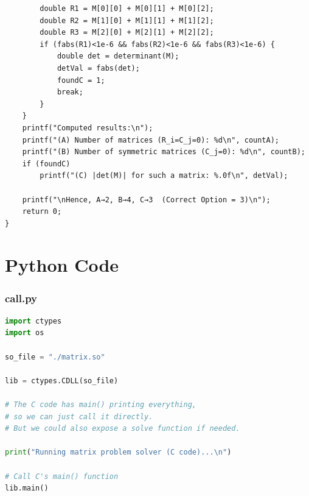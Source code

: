 \documentclass{beamer}
\theoremstyle{remark}
\numberwithin{equation}{section}
\numberwithin{equation}{section}
\begin{document}
   \begin{frame}[fragile]
   \begin{lstlisting}
        double R1 = M[0][0] + M[0][1] + M[0][2];
        double R2 = M[1][0] + M[1][1] + M[1][2];
        double R3 = M[2][0] + M[2][1] + M[2][2];
        if (fabs(R1)<1e-6 && fabs(R2)<1e-6 && fabs(R3)<1e-6) {
            double det = determinant(M);
            detVal = fabs(det);
            foundC = 1;
            break;
        }
    }
    printf("Computed results:\n");
    printf("(A) Number of matrices (R_i=C_j=0): %d\n", countA);
    printf("(B) Number of symmetric matrices (C_j=0): %d\n", countB);
    if (foundC)
        printf("(C) |det(M)| for such a matrix: %.0f\n", detVal);

    printf("\nHence, A→2, B→4, C→3  (Correct Option = 3)\n");
    return 0;
}

\end{lstlisting}
\end{frame}

\section{Python Code}
\begin{frame}[fragile]
\frametitle{call.py}
\begin{lstlisting}[language=Python]
import ctypes
import os

so_file = "./matrix.so"

lib = ctypes.CDLL(so_file)

# The C code has main() printing everything,
# so we can just call it directly.
# But we could also expose a solve function if needed.

print("Running matrix problem solver (C code)...\n")

# Call C's main() function
lib.main()

\end{lstlisting}
\end{frame}
\end{document}
